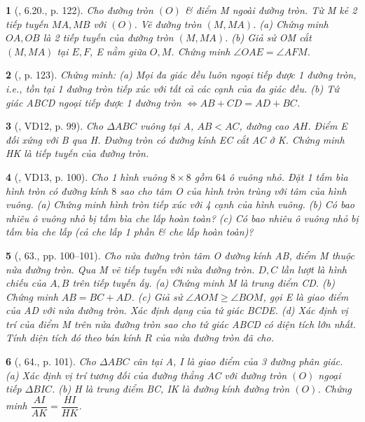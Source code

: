 \documentclass{article}
\newtheorem{baitoan}{}
\begin{document}
\begin{baitoan}[\cite{Binh_boi_duong_Toan_9_tap_1}, 6.20., p. 122]
	Cho đường tròn $(O)$ \& điểm M ngoài đường tròn. Từ M kẻ 2 tiếp tuyến $MA,MB$ với $(O)$. Vẽ đường tròn $(M,MA)$. (a) Chứng minh $OA,OB$ là 2 tiếp tuyến của đường tròn $(M,MA)$. (b) Giả sử OM cắt $(M,MA)$ tại $E,F$, E nằm giữa $O,M$. Chứng minh $\angle{OAE} = \angle{AFM}$.
\end{baitoan}

\begin{baitoan}[\cite{Binh_boi_duong_Toan_9_tap_1}, p. 123]
	Chứng minh: (a) Mọi đa giác đều luôn ngoại tiếp được 1 đường tròn, i.e., tồn tại 1 đường tròn tiếp xúc với tất cả các cạnh của đa giác đều. (b) Tứ giác ABCD ngoại tiếp được 1 đường tròn $\Leftrightarrow AB + CD = AD + BC$.
\end{baitoan}

\begin{baitoan}[\cite{Binh_Toan_9_tap_1}, VD12, p. 99]
	Cho $\Delta ABC$ vuông tại A, $AB < AC$, đường cao $AH$. Điểm E đối xứng với B qua H. Đường tròn có đường kính EC cắt AC ở K. Chứng minh HK là tiếp tuyến của đường tròn.
\end{baitoan}

\begin{baitoan}[\cite{Binh_Toan_9_tap_1}, VD13, p. 100]
	Cho 1 hình vuông $8\times8$ gồm $64$ ô vuông nhỏ. Đặt 1 tấm bìa hình tròn có đường kính $8$ sao cho tâm O của hình tròn trùng với tâm của hình vuông. (a) Chứng minh hình tròn tiếp xúc với 4 cạnh của hình vuông. (b) Có bao nhiêu ô vuông nhỏ bị tấm bìa che lấp hoàn toàn? (c) Có bao nhiêu ô vuông nhỏ bị tấm bìa che lấp (cả che lấp 1 phần \& che lấp hoàn toàn)?
\end{baitoan}

\begin{baitoan}[\cite{Binh_Toan_9_tap_1}, 63., pp. 100--101]
	Cho nửa đường tròn tâm O đường kính AB, điểm M thuộc nửa đường tròn. Qua M vẽ tiếp tuyến với nửa đường tròn. $D,C$ lần lượt là hình chiếu của $A,B$ trên tiếp tuyến ấy. (a) Chứng minh M là trung điểm CD. (b) Chứng minh $AB = BC + AD$. (c) Giả sử $ \angle{AOM}\ge\angle{BOM}$, gọi E là giao điểm của AD với nửa đường tròn. Xác định dạng của tứ giác BCDE. (d) Xác định vị trí của điểm M trên nửa đường tròn sao cho tứ giác ABCD có diện tích lớn nhất. Tính diện tích đó theo bán kính $R$ của nửa đường tròn đã cho.
\end{baitoan}

\begin{baitoan}[\cite{Binh_Toan_9_tap_1}, 64., p. 101]
	Cho $\Delta ABC$ cân tại A, I là giao điểm của 3 đường phân giác. (a) Xác định vị trí tương đối của đường thẳng AC với đường tròn $(O)$ ngoại tiếp $\Delta BIC$. (b) H là trung điểm BC, IK là đường kính đường tròn $(O)$. Chứng minh $\dfrac{AI}{AK} = \dfrac{HI}{HK}$.
\end{baitoan}
\end{document}

